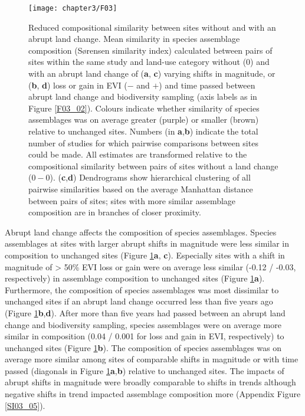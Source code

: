 \begin{figure}[ht]
\centering
\texttt{[image: chapter3/F03]}
\caption{Reduced compositional similarity between sites without and with an abrupt land change. Mean similarity in species assemblage composition (S\o rensen similarity index) calculated between pairs of sites within the same study and land-use category without ($0$) and with an abrupt land change of (\textbf{a}, \textbf{c}) varying shifts in magnitude, or (\textbf{b}, \textbf{d}) loss or gain in EVI ($-$ and $+$) and time passed between abrupt land change and biodiversity sampling (axis labels as in Figure \ref{F03_02}). Colours indicate whether similarity of species assemblages was on average greater (purple) or smaller (brown) relative to unchanged sites. Numbers (in \textbf{a},\textbf{b}) indicate the total number of studies for which pairwise comparisons between sites could be made. All estimates are transformed relative to the compositional similarity between pairs of sites without a land change ($0 - 0$). (\textbf{c},\textbf{d}) Dendrograms show hierarchical clustering of all pairwise similarities based on the average Manhattan distance between pairs of sites; sites with more similar assemblage composition are in branches of closer proximity. }
\label{F03_03}
\end{figure}

Abrupt land change affects the composition of species assemblages. Species assemblages at sites with larger abrupt shifts in magnitude were less similar in composition to unchanged sites (Figure \ref{F03_03}\textbf{a}, \textbf{c}). Especially sites with a shift in magnitude of > 50\% EVI loss or gain were on average less similar (-0.12 / -0.03, respectively) in assemblage composition to unchanged sites (Figure \ref{F03_03}\textbf{a}). Furthermore, the composition of species assemblages was most dissimilar to unchanged sites if an abrupt land change occurred less than five years ago (Figure \ref{F03_03}\textbf{b},\textbf{d}). After more than five years had passed between an abrupt land change and biodiversity sampling, species assemblages were on average more similar in composition (0.04 / 0.001 for loss and gain in EVI, respectively) to unchanged sites (Figure \ref{F03_03}\textbf{b}). The composition of species assemblages was on average more similar among sites of comparable shifts in magnitude or with time passed (diagonals in Figure \ref{F03_03}\textbf{a},\textbf{b}) relative to unchanged sites. The impacts of abrupt shifts in magnitude were broadly comparable to shifts in trends although negative shifts in trend impacted assemblage composition more (Appendix Figure \ref{SI03_05}).

